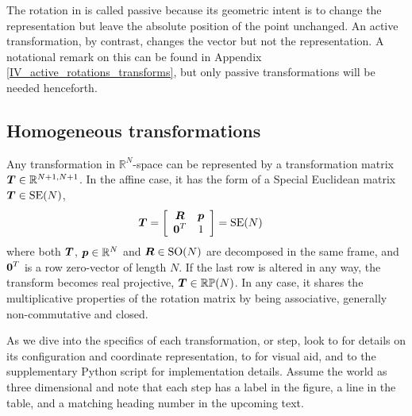The rotation in  is called passive because its geometric intent is to change the representation but leave the absolute position of the point unchanged. An active transformation, by contrast, changes the vector but not the representation. A notational remark on this can be found in Appendix \ref{IV_active_rotations_transforms}, but only passive transformations will be needed henceforth.


\subsection{Homogeneous transformations}

Any transformation in $\mathbb{R}^N$-space can be represented by a transformation matrix $\boldsymbol{T} \in \mathbb{R}^{N+1,N+1}$. In the affine case, it has the form of a Special Euclidean matrix $\boldsymbol{T}\in\mathrm{SE}(N)$,
%
\begin{align}
\dvec{T} &= 
\left[\begin{array}{c c}
 \mat{R}  & \dvec{p} \\%
 \dvec{0}^T  &  1
\end{array}\right] = \mathrm{SE}(N)\label{IV_eq_T_decomposed}
\end{align}
%
where both $\boldsymbol{T}$, $\boldsymbol{p}\in\mathbb{R}^N$ and $\boldsymbol{R}\in\mathrm{SO}(N)$ are decomposed in the same frame, and $\boldsymbol{0}^T$ is a row zero-vector of length $N$. If the last row is altered in any way, the transform becomes real projective, $\boldsymbol{T}\in\mathbb{RP}(N)$. In any case, it shares the multiplicative properties of the rotation matrix by being associative, generally non-commutative and closed. %


As we dive into the specifics of each transformation, or step, look to  for details on its configuration and coordinate representation, to  for visual aid, and to the supplementary Python script for implementation details. Assume the world as three dimensional and note that each step has a label in the figure, a line in the table, and a matching heading number in the upcoming text.



